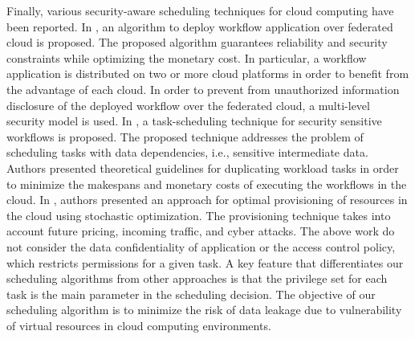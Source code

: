 Finally, various security-aware scheduling techniques for cloud computing have been reported. In \cite{wen2016cost}, an algorithm to deploy workflow application over federated cloud is proposed. The proposed algorithm guarantees reliability and security constraints while optimizing the monetary cost. In particular, a workflow application is distributed on two or more cloud platforms in order to benefit from the advantage of each cloud. In order to prevent from unauthorized information disclosure of the deployed workflow over the federated cloud, a multi-level security model is used. In \cite{chen2017scheduling}, a task-scheduling technique for security sensitive workflows is proposed. The proposed technique addresses the problem of scheduling tasks with data dependencies, i.e., sensitive intermediate data. Authors presented theoretical guidelines for duplicating workload tasks in order to minimize the makespans and monetary costs of executing the workflows in the cloud. In \cite{chase2017scalable}, authors presented an approach for optimal provisioning of resources in the cloud using stochastic optimization. The provisioning technique takes into account future pricing, incoming traffic, and cyber attacks. The above work do not consider the data confidentiality of application or the access control policy, which restricts permissions for a given task. A key feature that differentiates our scheduling algorithms from other approaches is that the privilege set for each task is the main parameter in the scheduling decision. The objective of our scheduling algorithm is to minimize the risk of data leakage due to vulnerability of virtual resources in cloud computing environments.



%
%
%
%
